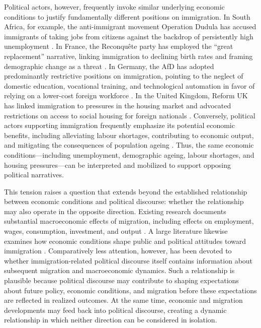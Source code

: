 \documentclass[12pt]{scrartcl}
\numberwithin{equation}{section}				%
\begin{document}
    Political actors, however, frequently invoke similar underlying economic conditions to justify fundamentally different positions on immigration. In South Africa, for example, the anti-immigrant movement Operation Dudula has accused immigrants of taking jobs from citizens against the backdrop of persistently high unemployment \parencite{yu2025reexamining,hlatshwayo2023south}. In France, the Reconquête party has employed the ``great replacement'' narrative, linking immigration to declining birth rates and framing demographic change as a threat \parencite{ekman2022great}. In Germany, the AfD has adopted predominantly restrictive positions on immigration, pointing to the neglect of domestic education, vocational training, and technological automation in favor of relying on a lower-cost foreign workforce \parencite{bt_drucksache_20_5225}. In the United Kingdom, Reform UK has linked immigration to pressures in the housing market and advocated restrictions on access to social housing for foreign nationals \parencite{reformuk2025}. Conversely, political actors supporting immigration frequently emphasize its potential economic benefits, including alleviating labour shortages, contributing to economic output, and mitigating the consequences of population ageing \parencite{ekman2022great}. Thus, the same economic conditions---including unemployment, demographic ageing, labour shortages, and housing pressures---can be interpreted and mobilized to support opposing political narratives.
    
    This tension raises a question that extends beyond the established relationship between economic conditions and political discourse: whether the relationship may also operate in the opposite direction. Existing research documents substantial macroeconomic effects of migration, including effects on employment, wages, consumption, investment, and output \parencite{maffei2021does, ortega2009causes, abramitzky2017immigration}. A large literature likewise examines how economic conditions shape public and political attitudes toward immigration \parencite{abdelatif2026uncertainty, scheve2001labor, hainmueller2014public, dustmann2007racial}. Comparatively less attention, however, has been devoted to whether immigration-related political discourse itself contains information about subsequent migration and macroeconomic dynamics. Such a relationship is plausible because political discourse may contribute to shaping expectations about future policy, economic conditions, and migration before these expectations are reflected in realized outcomes. At the same time, economic and migration developments may feed back into political discourse, creating a dynamic relationship in which neither direction can be considered in isolation.
    
\end{document}
